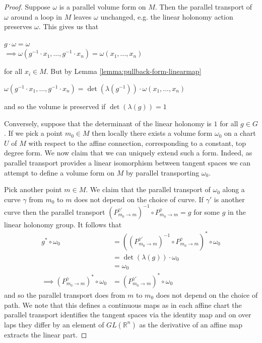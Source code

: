 \begin{proof}
    Suppose $\omega$ is a parallel volume form on $M$. Then the parallel transport of $\omega$ around a loop in $M$
    leaves $\omega$ unchanged, e.g. the linear holonomy action preserves $\omega$. This gives us that
    \begin{center}
        $g\cdot \omega = \omega$\\
        $\implies \omega(g^{-1}\cdot x_1, \dots, g^{-1}\cdot x_n) = \omega(x_1, \dots, x_n)$\\
    \end{center}
    for all $x_i \in M$. But by Lemma \ref{lemma:pullback-form-linearmap}
    \begin{center}
        $\omega(g^{-1}\cdot x_1, \dots, g^{-1}\cdot x_n) = \det(\lambda(g^{-1}))\cdot \omega(x_1, \dots, x_n)$
    \end{center}
    and so the volume is preserved if $\det(\lambda(g)) = 1$

    Conversely, suppose that the determinant of the linear holonomy is $1$ for all
    $g \in G$. If we pick a point $m_0 \in M$ then locally there exists a volume
    form $\omega_0$ on a chart $U$ of $M$ with respect to the affine connection,
    corresponding to a constant, top degree form. We now claim that we can uniquely
    extend such a form. Indeed, as parallel transport provides a linear isomorphism
    between tangent spaces we can attempt to define a volume form on $M$ by
    parallel transporting $\omega_0$.

    Pick another point $m \in M$. We claim that the parallel transport of
    $\omega_0$ along a curve $\gamma$ from $m_0$ to $m$ does not depend on the
    choice of curve. If $\gamma'$ is another curve then the parallel transport
    $(P^{\gamma'}_{m_0 \to m})^{-1} \circ P^{\gamma}_{m_0 \to m} = g$ for some $g$
    in the linear holonomy group. It follows that
    \begin{align*}
        g^* \circ \omega_0                                 & = ((P^{\gamma'}_{m_0 \to m})^{-1} \circ P^{\gamma}_{m_0 \to m})^* \circ \omega_0 \\
                                                           & = \det(\lambda(g))\cdot \omega_0                                                 \\
                                                           & = \omega_0                                                                       \\
        \implies (P^{\gamma}_{m_0 \to m})^* \circ \omega_0 & = (P^{\gamma'}_{m_0 \to m})^* \circ \omega_0
    \end{align*}
    and so the parallel transport does from $m$ to $m_0$ does not depend on the choice of path. We note
    that this defines a continuous maps as in each affine chart the parallel transport identifies the tangent
    spaces via the identity map and on over laps they differ by an element of $GL(\mathbb{R}^n)$ as the derivative
    of an affine map extracts the linear part.
\end{proof}


